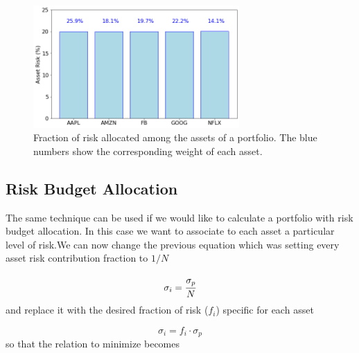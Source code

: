 \begin{figure}[htb]
\centering
\includegraphics[width=0.7\textwidth]{figures/risk_parity}
\caption{Fraction of risk allocated among the assets of a portfolio. The blue numbers show the corresponding weight of each asset.}
\label{fig:risk_parity}
\end{figure}

\subsection{Risk Budget Allocation}
\label{risk-budget-allocation}

The same technique can be used if we would like to calculate a portfolio with risk budget allocation. In this case we want to associate to each asset a particular level of risk.We can now change the previous equation which was setting every asset risk contribution fraction to $1/N$

\begin{equation} 
\sigma _{i}=\cfrac{\sigma_p}{N} 
\end{equation}
and replace it with the desired fraction of risk (\(f_i\)) specific for each asset

\begin{equation} 
\sigma _{i}=f_i \cdot \sigma_p 
\end{equation}
so that the relation to minimize becomes

